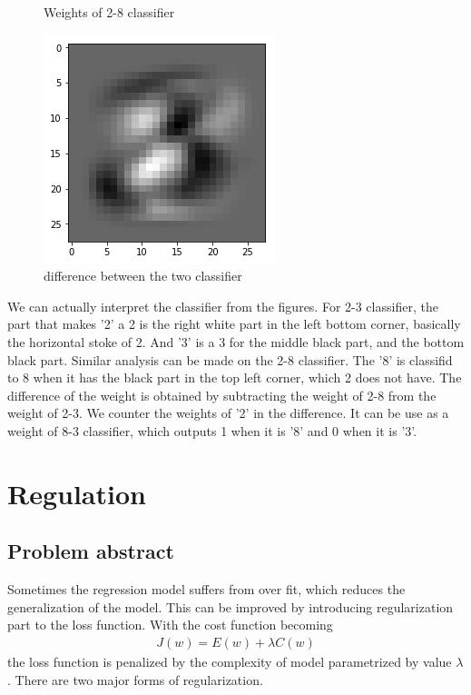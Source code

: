 \documentclass{article}
\begin{document}
\begin{figure}[h]
\begin{minipage}{0.3\textwidth}
		\caption{Weights of 2-8 classifier}
	\end{minipage}\hfill
	\begin{minipage}{0.3\textwidth}
		\centering
		\includegraphics[width=\textwidth]{pics/3_8.png}
		\caption{difference between the two classifier}
	\end{minipage}
\end{figure}
We can actually interpret the classifier from the figures. For 2-3 classifier, the part that makes '2' a 2 is the right white part in the left bottom corner, basically the horizontal stoke of 2. And '3' is a 3 for the middle black part, and the bottom black part. Similar analysis can be made on the 2-8 classifier. The '8' is classifid to 8 when it has the black part in the top left corner, which 2 does not have. The difference of the weight is obtained by subtracting the weight of 2-8 from the weight of 2-3. We counter the weights of '2' in the difference. It can be use as a weight of 8-3 classifier, which outputs 1 when it is '8' and 0 when it is '3'. 
\section{Regulation}
\subsection{Problem abstract}
Sometimes the regression model suffers from over fit, which reduces the generalization of the model. This can be improved by introducing regularization part to the loss function. With the cost function becoming \begin{align*}
J(w) = E(w) + \lambda C(w)
\end{align*}
 the loss function is penalized by the complexity of model parametrized by value $\lambda$. There are two major forms of regularization. 
 
\end{document}
